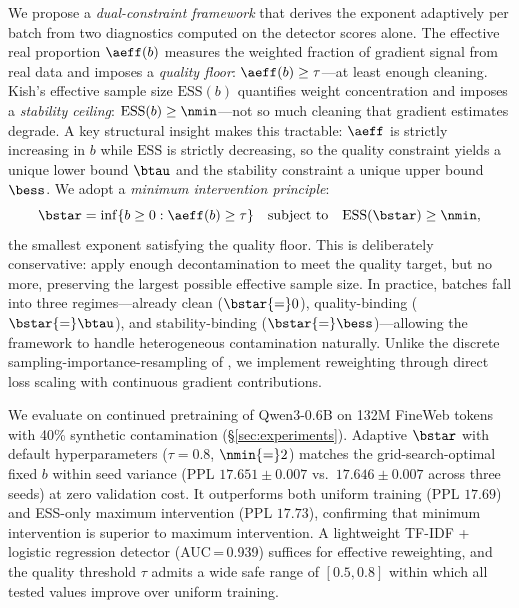 We propose a \emph{dual-constraint framework} that derives the exponent adaptively per batch from two diagnostics computed on the detector scores alone.
The effective real proportion $\aeff(b)$ measures the weighted fraction of gradient signal from real data and imposes a \emph{quality floor}: $\aeff(b) \geq \tau$---at least enough cleaning.
Kish's effective sample size $\mathrm{ESS}(b)$ \citep{vehtari2024psis} quantifies weight concentration and imposes a \emph{stability ceiling}: $\mathrm{ESS}(b) \geq \nmin$---not so much cleaning that gradient estimates degrade.
A key structural insight makes this tractable: $\aeff$ is strictly increasing in $b$ while $\mathrm{ESS}$ is strictly decreasing, so the quality constraint yields a unique lower bound $\btau$ and the stability constraint a unique upper bound $\bess$.
We adopt a \emph{minimum intervention principle}:
\begin{equation*}
  \bstar = \inf\{b \geq 0 : \aeff(b) \geq \tau\} \quad \text{subject to} \quad \mathrm{ESS}(\bstar) \geq \nmin,
\end{equation*}
the smallest exponent satisfying the quality floor.
This is deliberately conservative: apply enough decontamination to meet the quality target, but no more, preserving the largest possible effective sample size.
In practice, batches fall into three regimes---already clean ($\bstar{=}0$), quality-binding ($\bstar{=}\btau$), and stability-binding ($\bstar{=}\bess$)---allowing the framework to handle heterogeneous contamination naturally.
Unlike the discrete sampling-importance-resampling of \cite{drayson2025detection}, we implement reweighting through direct loss scaling with continuous gradient contributions.

We evaluate on continued pretraining of Qwen3-0.6B on 132M FineWeb \citep{penedo2024fineweb} tokens with 40\% synthetic contamination (\S\ref{sec:experiments}).
Adaptive $\bstar$ with default hyperparameters ($\tau{=}0.8$, $\nmin{=}2$) matches the grid-search-optimal fixed $b$ within seed variance (PPL $17.651 {\pm} 0.007$ vs.\ $17.646 {\pm} 0.007$ across three seeds) at zero validation cost.
It outperforms both uniform training (PPL $17.69$) and ESS-only maximum intervention (PPL $17.73$), confirming that minimum intervention is superior to maximum intervention.
A lightweight TF-IDF + logistic regression detector (AUC\,=\,0.939) suffices for effective reweighting, and the quality threshold $\tau$ admits a wide safe range of $[0.5, 0.8]$ within which all tested values improve over uniform training.

